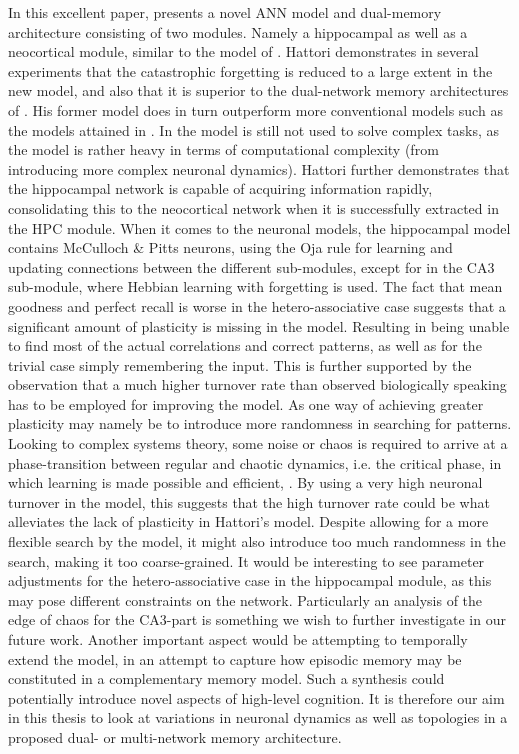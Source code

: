 In this excellent paper, \cite{Hattori2014} presents a novel ANN model and dual-memory architecture consisting of two modules. Namely a hippocampal as well as a neocortical module, similar to the model of \cite{McClelland1995}. Hattori demonstrates in several experiments that the catastrophic forgetting is reduced to a large extent in the new model, and also that it is superior to the dual-network memory architectures of \cite{Hattori2010}. His former model does in turn outperform more conventional models such as the models attained in \cite{Ans1997, French1997}. In \cite{Hattori2014} the model is still not used to solve complex tasks, as the model is rather heavy in terms of computational complexity (from introducing more complex neuronal dynamics). Hattori further demonstrates that the hippocampal network is capable of acquiring information rapidly, consolidating this to the neocortical network when it is successfully extracted in the HPC module.
When it comes to the neuronal models, the hippocampal model contains McCulloch \& Pitts neurons, using the Oja rule for learning and updating connections between the different sub-modules, except for in the CA3 sub-module, where Hebbian learning with forgetting is used.
The fact that mean goodness and perfect recall is worse in the hetero-associative case suggests that a significant amount of plasticity is missing in the model. Resulting in being unable to find most of the actual correlations and correct patterns, as well as for the trivial case simply remembering the input. This is further supported by the observation that a much higher turnover rate than observed biologically speaking has to be employed for improving the model. As one way of achieving greater plasticity may namely be to introduce more randomness in searching for patterns. Looking to complex systems theory, some noise or chaos is required to arrive at a phase-transition between regular and chaotic dynamics, i.e. the critical phase, in which learning is made possible and efficient, \cite{Langton1990, Newman2003}. By using a very high neuronal turnover in the model, this suggests that the high turnover rate could be what alleviates the lack of plasticity in Hattori's model. Despite allowing for a more flexible search by the model, it might also introduce too much randomness in the search, making it too coarse-grained. It would be interesting to see parameter adjustments for the hetero-associative case in the hippocampal module, as this may pose different constraints on the network. Particularly an analysis of the edge of chaos for the CA3-part is something we wish to further investigate in our future work. Another important aspect would be attempting to temporally extend the model, in an attempt to capture how episodic memory may be constituted in a complementary memory model. Such a synthesis could potentially introduce novel aspects of high-level cognition. It is therefore our aim in this thesis to look at variations in neuronal dynamics as well as topologies in a proposed dual- or multi-network memory architecture.


